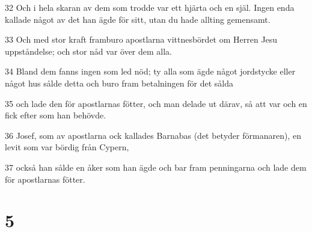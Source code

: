\par 32 Och i hela skaran av dem som trodde var ett hjärta och en själ. Ingen enda kallade något av det han ägde för sitt, utan du hade allting gemensamt.
\par 33 Och med stor kraft framburo apostlarna vittnesbördet om Herren Jesu uppståndelse; och stor nåd var över dem alla.
\par 34 Bland dem fanns ingen som led nöd; ty alla som ägde något jordstycke eller något hus sålde detta och buro fram betalningen för det sålda
\par 35 och lade den för apostlarnas fötter, och man delade ut därav, så att var och en fick efter som han behövde.
\par 36 Josef, som av apostlarna ock kallades Barnabas (det betyder förmanaren), en levit som var bördig från Cypern,
\par 37 också han sålde en åker som han ägde och bar fram penningarna och lade dem för apostlarnas fötter.

\chapter{5}

